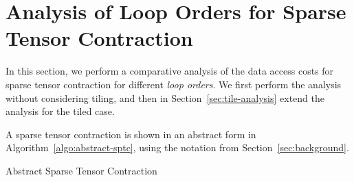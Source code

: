 \section{Analysis of Loop Orders for Sparse Tensor Contraction}
\label{sec:looporder}



In this section, we perform a comparative analysis of the data access costs for sparse tensor contraction for different {\em loop orders}. We first perform the analysis without considering tiling, and then in Section~\ref{sec:tile-analysis} extend the analysis for the tiled case.

 
A sparse tensor contraction is shown in an abstract form in Algorithm~\ref{algo:abstract-sptc}, using the notation from Section~\ref{sec:background}.

\begin{algorithm}[h]
\DontPrintSemicolon
\LinesNumbered
{}
\caption{Abstract Sparse Tensor Contraction\label{algo:abstract-sptc}}
\end{algorithm}


